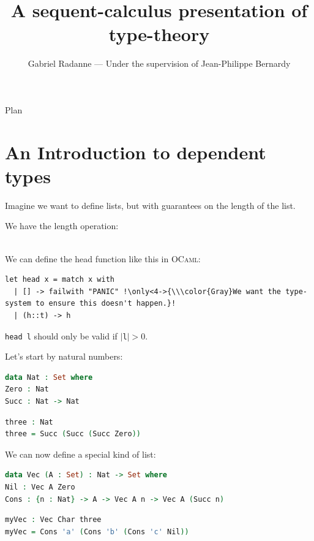 \documentclass[xcolor=svgnames,11pt]{beamer}
\title{A sequent-calculus presentation of type-theory}
\author[Gabriel Radanne]{Gabriel Radanne --- Under the supervision of Jean-Philippe Bernardy}
\institute[ENS Rennes]{ENS Rennes --- Chalmers University of Technology}
\newcommand{\mysc}[1]{\textsc{#1}\xspace}
\begin{document}
\begin{frame}[plain]
\titlepage
\end{frame}

\begin{frame}{Plan}
\tableofcontents%
\end{frame}

\section{An Introduction to dependent types}

\begin{frame}[fragile]
  Imagine we want to define lists, but with guarantees on the length of the list.

  We have the length operation:


  \pause\pause
  \ \\We can define the head function like this in \mysc{OCaml}:
\begin{lstlisting}[language=caml]
let head x = match x with
  | [] -> failwith "PANIC" !\only<4->{\\\color{Gray}We want the type-system to ensure this doesn't happen.}!
  | (h::t) -> h
\end{lstlisting}\pause

\lstinline[language=caml,basicstyle=\ttfamily]{head l}
should only be valid if $|$\lstinline[language=caml,basicstyle=\ttfamily]{l}$|>0$.
\end{frame}

\begin{frame}[fragile]
  Let's start by natural numbers:
\begin{lstlisting}[language=Agda]
data Nat : Set where
Zero : Nat
Succ : Nat -> Nat
\end{lstlisting}\pause

\begin{lstlisting}[language=Agda]
three : Nat
three = Succ (Succ (Succ Zero))
\end{lstlisting}\pause

  We can now define a special kind of list:
\begin{lstlisting}[language=Agda]
data Vec (A : Set) : Nat -> Set where
Nil : Vec A Zero
Cons : {n : Nat} -> A -> Vec A n -> Vec A (Succ n)
\end{lstlisting}\pause

\begin{lstlisting}[language=Agda]
myVec : Vec Char three
myVec = Cons 'a' (Cons 'b' (Cons 'c' Nil))
\end{lstlisting}

\end{frame}
\end{document}
